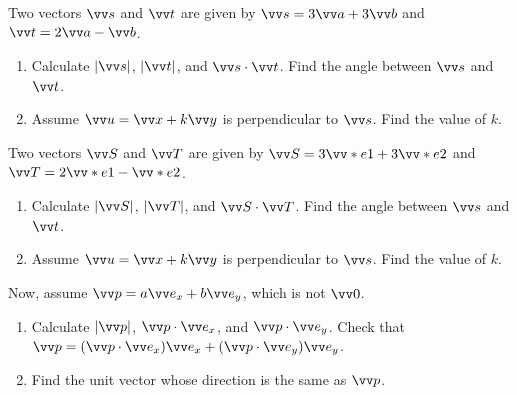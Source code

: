 \documentclass[11pt,pdfa,lastpage]{MishoNote}
\begin{document}
\begin{problems}
 Two vectors $\vc s$ and $\vc t$ are given by $\vc s=3\vc a+3\vc b$ and $\vc t=2\vc a-\vc b$.
  \begin{enumerate}
    \item Calculate $|\vc s|$, $|\vc t|$, and $\vc s\cdot\vc t$. Find the angle between $\vc s$ and $\vc t$.
    \item Assume $\vc u=\vc x+k\vc y$ is perpendicular to $\vc s$. Find the value of $k$.
  \end{enumerate}
  Two vectors $\vc S$ and $\vc T$ are given by $\vc S=3\vc e_1+3\vc e_2$ and $\vc T=2\vc e_1-\vc e_2$.
  \begin{enumerate}[resume]
    \item Calculate $|\vc S|$, $|\vc T|$, and $\vc S\cdot\vc T$. Find the angle between $\vc s$ and $\vc t$.
    \item Assume $\vc u=\vc x+k\vc y$ is perpendicular to $\vc s$. Find the value of $k$.
  \end{enumerate}
  Now, assume $\vc p=a\vvex+b\vvey$, which is not $\vc 0$.
  \begin{enumerate}[resume]
    \item Calculate $|\vc p|$, $\vc p\cdot\vvex$, and $\vc p\cdot\vvey$. Check that $\vc p=(\vc p\cdot\vvex)\vvex+(\vc p\cdot\vvey)\vvey$.
    \item Find the unit vector whose direction is the same as $\vc p$.
  \end{enumerate}
\end{problems}
\end{document}
